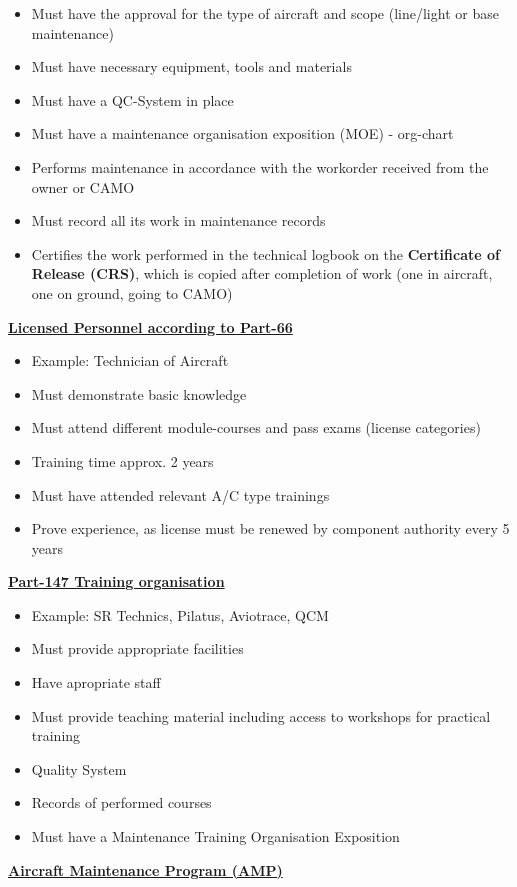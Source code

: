 \documentclass[9pt, landscape, fleqn]{scrartcl}
\begin{document}
\begin{multicols*}{3}
\begin{itemize}
    \item Must have the approval for the type of aircraft and scope (line/light or base maintenance)
    \item Must have necessary equipment, tools and materials 
    \item Must have a QC-System in place
    \item Must have a maintenance organisation exposition (MOE) - org-chart 
    \item Performs maintenance in accordance with the workorder received from the owner or CAMO 
    \item Must record all its work in maintenance records 
    \item Certifies the work performed in the technical logbook on the \textbf{Certificate of Release (CRS)}, which is copied after completion of work (one in aircraft, one on ground, going to CAMO)
\end{itemize}
\underline{\textbf{Licensed Personnel according to Part-66}}
\begin{itemize}
    \item Example: Technician of Aircraft 
    \item Must demonstrate basic knowledge 
    \item Must attend different module-courses and pass exams (license categories)
    \item Training time approx. 2 years 
    \item Must have attended relevant A/C type trainings
    \item Prove experience, as license must be renewed by component authority every 5 years  
\end{itemize}
\underline{\textbf{Part-147 Training organisation}}
\begin{itemize}
    \item Example: SR Technics, Pilatus, Aviotrace, QCM 
    \item Must provide appropriate facilities 
    \item Have apropriate staff 
    \item Must provide teaching material including access to workshops for practical training 
    \item Quality System 
    \item Records of performed courses 
    \item Must have a Maintenance Training Organisation Exposition 
\end{itemize}
\underline{\textbf{Aircraft Maintenance Program (AMP)}}

\end{multicols*}
\end{document}

